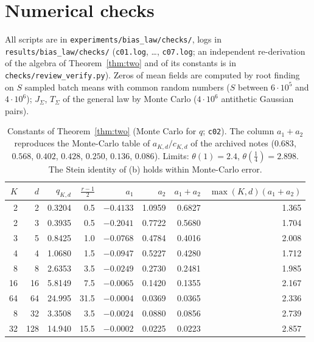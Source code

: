 \documentclass[10pt]{article}
\theoremstyle{definition}
\theoremstyle{remark}
\begin{document}
\section{Numerical checks}\label{sec:num}

All scripts are in \texttt{experiments/bias\_law/checks/}, logs in \texttt{results/bias\_law/checks/} (\texttt{c01.log}, \dots, \texttt{c07.log};
an independent re-derivation of the algebra of Theorem~\ref{thm:two} and of its constants is in
\texttt{checks/review\_verify.py}). Zeros of mean fields are computed by root
finding on $S$ sampled batch means with common random numbers ($S$ between $6\cdot10^5$ and $4\cdot10^6$); $J_\Sigma$,
$T_\Sigma$ of the general law by Monte Carlo ($4\cdot10^6$ antithetic Gaussian pairs).

\begin{table}[h]
\centering\small
\begin{tabular}{@{}rrrrrrrr@{}}
\toprule
$K$ & $d$ & $q_{K,d}$ & $\frac{r-1}2$ & $a_1$ & $a_2$ & $a_1+a_2$ & $\max(K,d)(a_1+a_2)$\\
\midrule
2 & 2 & 0.3204 & 0.5 & $-0.4133$ & 1.0959 & 0.6827 & 1.365\\
2 & 3 & 0.3935 & 0.5 & $-0.2041$ & 0.7722 & 0.5680 & 1.704\\
3 & 5 & 0.8425 & 1.0 & $-0.0768$ & 0.4784 & 0.4016 & 2.008\\
4 & 4 & 1.0680 & 1.5 & $-0.0947$ & 0.5227 & 0.4280 & 1.712\\
8 & 8 & 2.6353 & 3.5 & $-0.0249$ & 0.2730 & 0.2481 & 1.985\\
16 & 16 & 5.8149 & 7.5 & $-0.0065$ & 0.1420 & 0.1355 & 2.167\\
64 & 64 & 24.995 & 31.5 & $-0.0004$ & 0.0369 & 0.0365 & 2.336\\
8 & 32 & 3.3508 & 3.5 & $-0.0024$ & 0.0880 & 0.0856 & 2.739\\
32 & 128 & 14.940 & 15.5 & $-0.0002$ & 0.0225 & 0.0223 & 2.857\\
\bottomrule
\end{tabular}
\caption{Constants of Theorem~\ref{thm:two} (Monte Carlo for $q$; \texttt{c02}). The column $a_1+a_2$ reproduces the
Monte-Carlo table of $a_{K,d}/c_{K,d}$ of the archived notes ($0.683$, $0.568$, $0.402$, $0.428$, $0.250$, $0.136$,
$0.086$). Limits: $\theta(1)=2.4$, $\theta(\frac14)=2.898$. The Stein identity of (b) holds within Monte-Carlo
error.}\label{tab:const}
\end{table}
\end{document}
